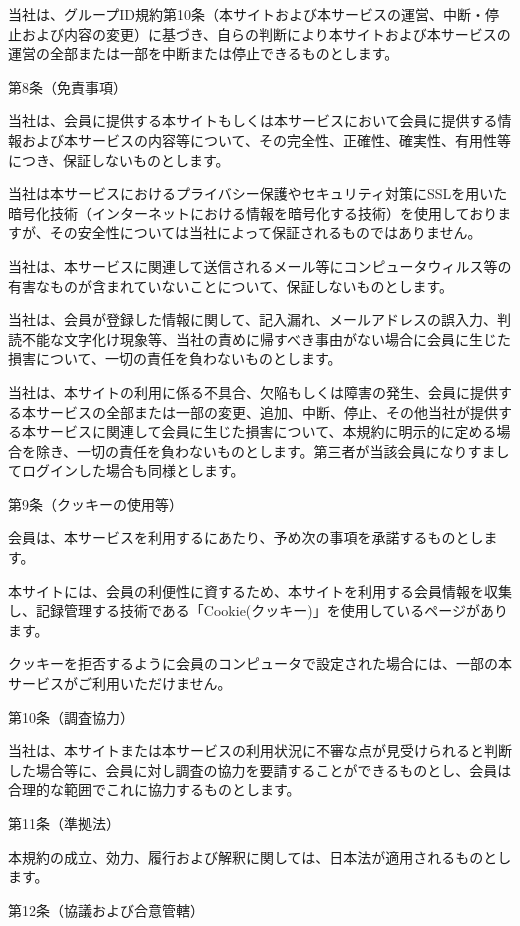     当社は、グループID規約第10条（本サイトおよび本サービスの運営、中断・停止および内容の変更）に基づき、自らの判断により本サイトおよび本サービスの運営の全部または一部を中断または停止できるものとします。

第8条（免責事項）

    当社は、会員に提供する本サイトもしくは本サービスにおいて会員に提供する情報および本サービスの内容等について、その完全性、正確性、確実性、有用性等につき、保証しないものとします。

    当社は本サービスにおけるプライバシー保護やセキュリティ対策にSSLを用いた暗号化技術（インターネットにおける情報を暗号化する技術）を使用しておりますが、その安全性については当社によって保証されるものではありません。

    当社は、本サービスに関連して送信されるメール等にコンピュータウィルス等の有害なものが含まれていないことについて、保証しないものとします。

    当社は、会員が登録した情報に関して、記入漏れ、メールアドレスの誤入力、判読不能な文字化け現象等、当社の責めに帰すべき事由がない場合に会員に生じた損害について、一切の責任を負わないものとします。

    当社は、本サイトの利用に係る不具合、欠陥もしくは障害の発生、会員に提供する本サービスの全部または一部の変更、追加、中断、停止、その他当社が提供する本サービスに関連して会員に生じた損害について、本規約に明示的に定める場合を除き、一切の責任を負わないものとします。第三者が当該会員になりすましてログインした場合も同様とします。

第9条（クッキーの使用等）

会員は、本サービスを利用するにあたり、予め次の事項を承諾するものとします。

    本サイトには、会員の利便性に資するため、本サイトを利用する会員情報を収集し、記録管理する技術である「Cookie(クッキー)」を使用しているページがあります。

    クッキーを拒否するように会員のコンピュータで設定された場合には、一部の本サービスがご利用いただけません。

第10条（調査協力）

    当社は、本サイトまたは本サービスの利用状況に不審な点が見受けられると判断した場合等に、会員に対し調査の協力を要請することができるものとし、会員は合理的な範囲でこれに協力するものとします。

第11条（準拠法）

    本規約の成立、効力、履行および解釈に関しては、日本法が適用されるものとします。

第12条（協議および合意管轄）

